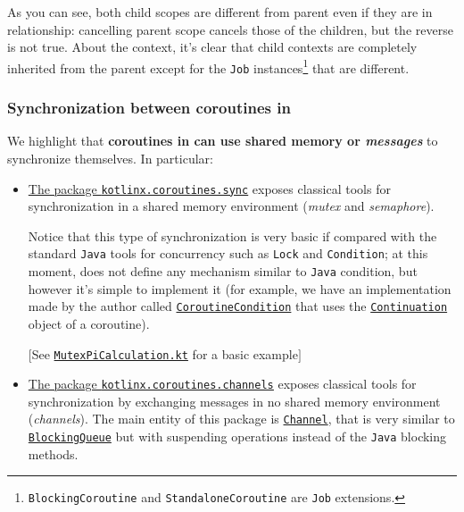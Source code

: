 As you can see, both child scopes are different from parent even if they are in relationship: cancelling parent scope cancels those of the children, but the reverse is not true.
About the context, it's clear that child contexts are completely inherited from the parent except for the \texttt{Job} instances\footnote{\texttt{BlockingCoroutine} and \texttt{StandaloneCoroutine} are \texttt{Job} extensions.} that are different.

\subsubsection{Synchronization between coroutines in \Kotlin}

We highlight that \textbf{coroutines in \Kotlin can use shared memory or \textit{messages}} to synchronize themselves. In particular:
\begin{itemize}
	\item \underline{The package \href{https://kotlinlang.org/api/kotlinx.coroutines/kotlinx-coroutines-core/kotlinx.coroutines.sync/}{\texttt{kotlinx.coroutines.sync}}} exposes classical tools for synchronization in a shared memory environment (\textit{mutex} and \textit{semaphore}).
	
	Notice that this type of synchronization is very basic if compared with the standard \texttt{Java} tools for concurrency such as \texttt{Lock} and \texttt{Condition}; at this moment, \Kotlin does not define any mechanism similar to \texttt{Java} condition, but however it's simple to implement it (for example, we have an implementation made by the author called \href{https://github.com/LM-96/KBomber/blob/main/kbomberx-concurrency/src/main/kotlin/kbomberx/concurrency/sync/CoroutineCondition.kt}{\texttt{CoroutineCondition}} that uses the \href{https://kotlinlang.org/api/latest/jvm/stdlib/kotlin.coroutines/-continuation/}{\texttt{Continuation}} object of a coroutine).
	
	$\big[$See \href{https://github.com/LM-96/Activity-Project-Operating-Systems-M-/blob/main/code/kotlin/unibo.apos.examples/src/main/kotlin/unibo/apos/examples/MutexPiCalculation.kt}{\texttt{MutexPiCalculation.kt}} for a basic example$\big]$
	
	\item \underline{The package \href{https://kotlinlang.org/api/kotlinx.coroutines/kotlinx-coroutines-core/kotlinx.coroutines.channels/}{\texttt{kotlinx.coroutines.channels}}} exposes classical tools for synchronization by exchanging messages in no shared memory environment (\textit{channels}).
	The main entity of this package is \href{https://kotlinlang.org/docs/channels.html}{\texttt{Channel}}, that is very similar to \href{https://docs.oracle.com/en/java/javase/18/docs/api/java.base/java/util/concurrent/BlockingQueue.html}{\texttt{BlockingQueue}} but with suspending operations instead of the \texttt{Java} blocking methods.
	

\end{itemize}
